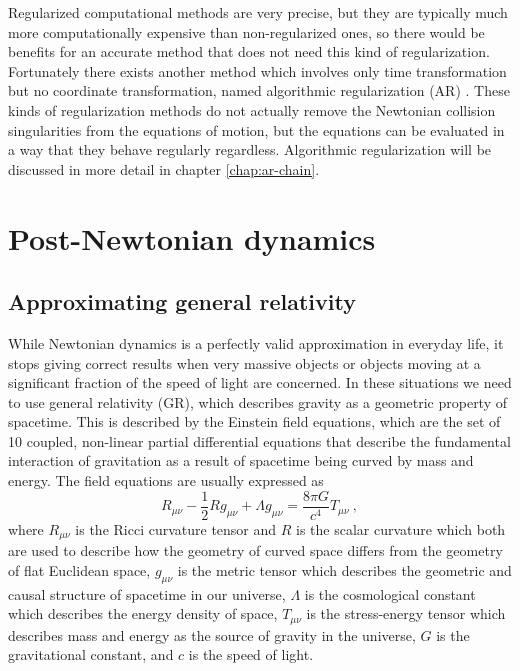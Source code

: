 \documentclass[english, oneside]{HYgradu}
\begin{document}
Regularized computational methods are very precise, but they are typically much more computationally expensive than non-regularized ones, so there would be benefits for an accurate method that does not need this kind of regularization. Fortunately there exists another method which involves only time transformation but no coordinate transformation, named algorithmic regularization (AR) \citep{diplomarbeit}. These kinds of regularization methods do not actually remove the Newtonian collision singularities from the equations of motion, but the equations can be evaluated in a way that they behave regularly regardless. Algorithmic regularization will be discussed in more detail in chapter \ref{chap:ar-chain}.



\section{Post-Newtonian dynamics} \label{sect:pndynam}

\subsection{Approximating general relativity}

While Newtonian dynamics is a perfectly valid approximation in everyday life, it stops giving correct results when very massive objects or objects moving at a significant fraction of the speed of light are concerned. In these situations we need to use general relativity (GR), which describes gravity as a geometric property of spacetime. This is described by the Einstein field equations, which are the set of 10 coupled, non-linear partial differential equations that describe the fundamental interaction of gravitation as a result of spacetime being curved by mass and energy. The field equations are usually expressed as
\begin{equation}
R_{\mu \nu} - \frac{1}{2}R g_{\mu \nu} + \Lambda g_{\mu \nu} = \frac{8 \pi G}{c^4} T_{\mu \nu} \ ,
\end{equation}
where $R_{\mu \nu}$ is the Ricci curvature tensor and $R$ is the scalar curvature which both are used to describe how the geometry of curved space differs from the geometry of flat Euclidean space, $g_{\mu \nu}$ is the metric tensor which describes the geometric and causal structure of spacetime in our universe, $\Lambda$ is the cosmological constant which describes the energy density of space, $T_{\mu \nu}$ is the stress-energy tensor which describes mass and energy as the source of gravity in the universe, $G$ is the gravitational constant, and $c$ is the speed of light.
\end{document}
